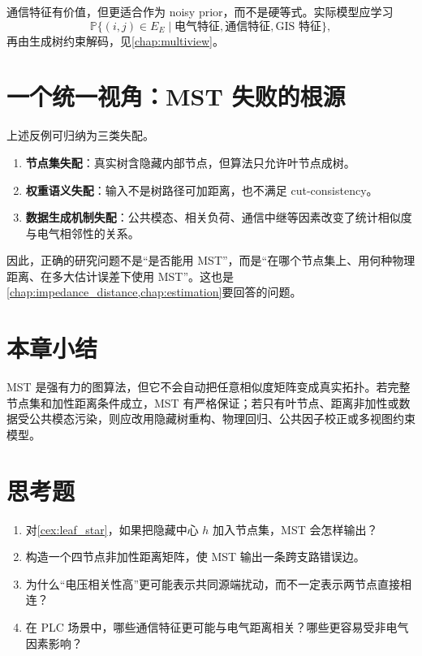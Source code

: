 通信特征有价值，但更适合作为 noisy prior，而不是硬等式。实际模型应学习
\begin{equation}
  \mathbb{P}\{(i,j)\in E_E\mid \text{电气特征},\text{通信特征},\text{GIS 特征}\},
\end{equation}
再由生成树约束解码，见\cref{chap:multiview}。

\section{一个统一视角：MST 失败的根源}

上述反例可归纳为三类失配。
\begin{enumerate}[label=(\arabic*)]
  \item \textbf{节点集失配}：真实树含隐藏内部节点，但算法只允许叶节点成树。
  \item \textbf{权重语义失配}：输入不是树路径可加距离，也不满足 cut-consistency。
  \item \textbf{数据生成机制失配}：公共模态、相关负荷、通信中继等因素改变了统计相似度与电气相邻性的关系。
\end{enumerate}

因此，正确的研究问题不是“是否能用 MST”，而是“在哪个节点集上、用何种物理距离、在多大估计误差下使用 MST”。这也是\cref{chap:impedance_distance,chap:estimation}要回答的问题。

\section{本章小结}

MST 是强有力的图算法，但它不会自动把任意相似度矩阵变成真实拓扑。若完整节点集和加性距离条件成立，MST 有严格保证；若只有叶节点、距离非加性或数据受公共模态污染，则应改用隐藏树重构、物理回归、公共因子校正或多视图约束模型。

\section*{思考题}
\begin{enumerate}
  \item 对\cref{cex:leaf_star}，如果把隐藏中心 $h$ 加入节点集，MST 会怎样输出？
  \item 构造一个四节点非加性距离矩阵，使 MST 输出一条跨支路错误边。
  \item 为什么“电压相关性高”更可能表示共同源端扰动，而不一定表示两节点直接相连？
  \item 在 PLC 场景中，哪些通信特征更可能与电气距离相关？哪些更容易受非电气因素影响？
\end{enumerate}
